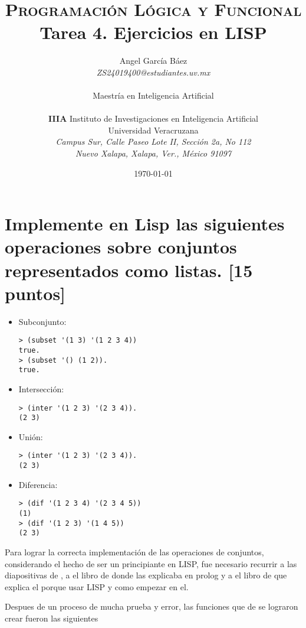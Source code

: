 \documentclass[11pt, letterpaper]{article}
\title{\textsc{Programación Lógica y Funcional} \\
	Tarea 4. Ejercicios en LISP}
\author{Angel García Báez \\ \emph{ZS24019400@estudiantes.uv.mx} \\ \\
	Maestría en Inteligencia Artificial \\ \\ \textbf{IIIA}
	Instituto de Investigaciones en Inteligencia Artificial \\
	Universidad Veracruzana \\ \emph{Campus Sur, Calle Paseo Lote II,
		Sección 2a, No 112} \\ \emph{Nuevo Xalapa, Xalapa, Ver., México 91097}}
\date{\today}
\begin{document}
\maketitle

\newpage


\section{Implemente en Lisp las siguientes operaciones sobre conjuntos representados como listas. [15 puntos]}


\begin{itemize}
	\item Subconjunto:

	\begin{verbatim}
> (subset '(1 3) '(1 2 3 4))
true.
> (subset '() (1 2)).
true.
	\end{verbatim}
	
	\item Intersección:

	\begin{verbatim}
> (inter '(1 2 3) '(2 3 4)).
(2 3)	
	\end{verbatim}

	\item Unión:

	\begin{verbatim}
> (inter '(1 2 3) '(2 3 4)).
(2 3)
	\end{verbatim}

	\item Diferencia:

	\begin{verbatim}
> (dif '(1 2 3 4) '(2 3 4 5))
(1)
> (dif '(1 2 3) '(1 4 5))
(2 3)
	\end{verbatim}
\end{itemize}

Para lograr la correcta implementación de las operaciones de conjuntos, considerando el hecho de ser un principiante en LISP, fue necesario recurrir a las diapositivas de \cite{guerra2024}, a el libro de \cite{clock2003} donde las explicaba en prolog y a el libro de \cite{seibel2006} que explica el porque usar LISP y como empezar en el.

Despues de un proceso de mucha prueba y error, las funciones que de se lograron crear fueron las siguientes
\end{document}
